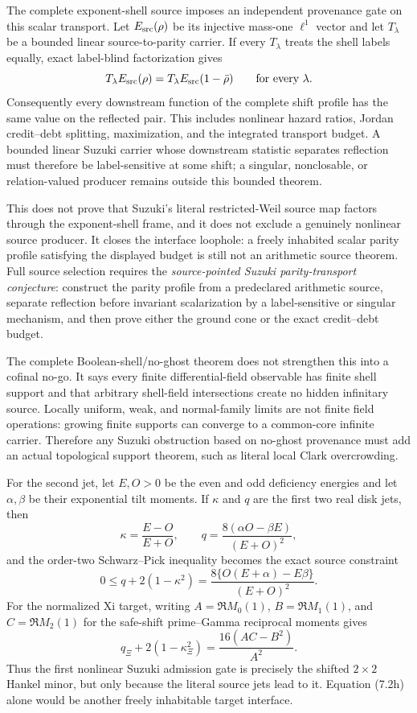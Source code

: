 \documentclass[11pt]{article}
\theoremstyle{definition}
\theoremstyle{remark}
\begin{document}
The complete exponent-shell source imposes an independent provenance gate on this scalar
transport.  Let $E_{\rm src}(\rho)$ be its injective mass-one $\ell^1$ vector and let
$T_\lambda$ be a bounded linear source-to-parity carrier.  If every $T_\lambda$ treats the shell
labels equally, exact label-blind factorization gives
\[
 T_\lambda E_{\rm src}(\rho)
 =
 T_\lambda E_{\rm src}(1-\bar\rho)
 \qquad\text{for every }\lambda .
\]
Consequently every downstream function of the complete shift profile has the same value on the
reflected pair.  This includes nonlinear hazard ratios, Jordan credit--debt splitting,
maximization, and the integrated transport budget.  A bounded linear Suzuki carrier whose
downstream statistic separates reflection must therefore be label-sensitive at some shift; a
singular, nonclosable, or relation-valued producer remains outside this bounded theorem.

This does not prove that Suzuki's literal restricted-Weil source map factors through the
exponent-shell frame, and it does not exclude a genuinely nonlinear source producer.  It closes
the interface loophole: a freely inhabited scalar parity profile satisfying the displayed
budget is still not an arithmetic source theorem.  Full source selection requires the
\emph{source-pointed Suzuki parity-transport conjecture}: construct the parity profile from a
predeclared arithmetic source, separate reflection before invariant scalarization by a
label-sensitive or singular mechanism, and then prove either the ground cone or the exact
credit--debt budget.

The complete Boolean-shell/no-ghost theorem does not strengthen this into a cofinal no-go.
It says every finite differential-field observable has finite shell support and that arbitrary
shell-field intersections create no hidden infinitary source.  Locally uniform, weak, and
normal-family limits are not finite field operations: growing finite supports can converge to a
common-core infinite carrier.  Therefore any Suzuki obstruction based on no-ghost provenance must
add an actual topological support theorem, such as literal local Clark overcrowding.

For the second jet, let $E,O>0$ be the even and odd deficiency energies and let
$\alpha,\beta$ be their exponential tilt moments.  If $\kappa$ and $q$ are the first two real
disk jets, then
\[
 \kappa=\frac{E-O}{E+O},\qquad
 q=\frac{8(\alpha O-\beta E)}{(E+O)^2},
\]
and the order-two Schwarz--Pick inequality becomes the exact source constraint
\[
0\leq q+2(1-\kappa^2)
   =\frac{8\{O(E+\alpha)-E\beta\}}{(E+O)^2}.
 \tag{7.2g}
\]
For the normalized Xi target, writing
$A=\Re M_0(1)$, $B=\Re M_1(1)$, and $C=\Re M_2(1)$ for the safe-shift
prime--Gamma reciprocal moments gives
\[
 q_\Xi+2(1-\kappa_\Xi^2)=\frac{16(AC-B^2)}{A^2}.
 \tag{7.2h}
\]
Thus the first nonlinear Suzuki admission gate is precisely the shifted $2\times2$ Hankel minor,
but only because the literal source jets lead to it.  Equation (7.2h) alone would be another
freely inhabitable target interface.
\end{document}
